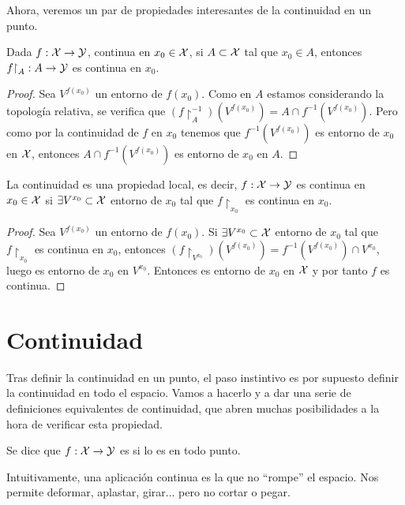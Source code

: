 Ahora, veremos un par de propiedades interesantes de la continuidad en un punto.

\begin{prop}
	Dada $f:\mathcal{X}\to\mathcal{Y}$, continua en $x_0\in\mathcal{X}$, si $A\subset\mathcal{X}$ tal que $x_0\in A$, entonces $f\mathord{\upharpoonright}_A:A\to\mathcal{Y}$ es continua en $x_0$.
	
	\begin{proof}
		Sea $V^{f(x_0)}$ un entorno de $f(x_0)$. Como en $A$ estamos considerando la topología relativa, se verifica que $(f\restriction_A^{-1})(V^{f(x_0)}) = A\cap f^{-1}(V^{f(x_0)})$. Pero como por la continuidad de $f$ en $x_0$ tenemos que $f^{-1}(V^{f(x_0)})$ es entorno de $x_0$ en $\mathcal{X}$, entonces $A\cap f^{-1}(V^{f(x_0)})$ es entorno de $x_0$ en $A$.
	\end{proof}
\end{prop}

\begin{prop}
	La continuidad es una propiedad local, es decir, $f:\mathcal{X}\to\mathcal{Y}$ es continua en $x_0\in\mathcal{X}$ si $\exists V^{x_0}\subset\mathcal{X}$ entorno de $x_0$ tal que $f\restriction_{x_0}$ es continua en $x_0$.
	
	\begin{proof}
		Sea $V^{f(x_0)}$ un entorno de $f(x_0)$. Si $\exists V^{x_0}\subset\mathcal{X}$ entorno de $x_0$ tal que $f\restriction_{x_0}$ es continua en $x_0$, entonces $(f\restriction_{V^{x_0}})(V^{f(x_0)}) = f^{-1}(V^{f(x_0)})\cap V^{x_0}$, luego es entorno de $x_0$ en $V^{x_0}$. Entonces es entorno de $x_0$ en $\mathcal{X}$ y por tanto $f$ es continua.
	\end{proof}
\end{prop}

\section{Continuidad}

Tras definir la continuidad en un punto, el paso instintivo es por supuesto definir la continuidad en todo el espacio. Vamos a hacerlo y a dar una serie de definiciones equivalentes de continuidad, que abren muchas posibilidades a la hora de verificar esta propiedad.

\begin{defi}[Continuidad]
	Se dice que $f:\mathcal{X}\to\mathcal{Y}$ es  si lo es en todo punto.
\end{defi}

Intuitivamente, una aplicación continua es la que no ``rompe'' el espacio. Nos permite deformar, aplastar, girar... pero no cortar o pegar.

